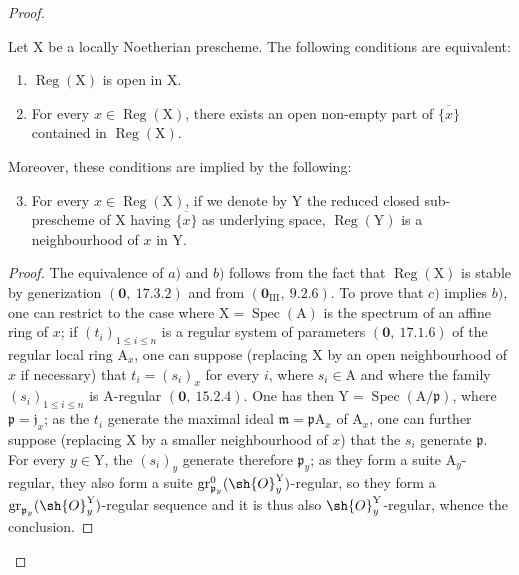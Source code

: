 \begin{proof}
\begin{proposition}[6.12.2]
\label{IV.6.12.2}
Let $\mathrm{X}$ be a locally Noetherian prescheme. The following conditions
are equivalent:
\begin{enumerate}[label=\emph{\alph*)}]
  \item $\operatorname{Reg}(\mathrm{X})$ is open in $\mathrm{X}$.
  \item For every $x\in\operatorname{Reg}(\mathrm{X})$, there exists an open non-empty part of $\overline{\{x\}}$ contained in $\operatorname{Reg}(\mathrm{X})$.
\end{enumerate}
Moreover, these conditions are implied by the following:
\begin{enumerate}[label=\emph{\alph*)}]
\setcounter{enumi}{2}
  \item For every $x\in\operatorname{Reg}(\mathrm{X})$, if we denote by $\mathrm{Y}$ the reduced closed sub-prescheme of $\mathrm{X}$ having $\overline{\{x\}}$
as underlying space, $\operatorname{Reg}(\mathrm{Y})$ is a neighbourhood of $x$ in $\mathrm{Y}$.
\end{enumerate}
\end{proposition}

\begin{proof}
The equivalence of $a)$ and $b)$ follows from the fact that $\operatorname{Reg}(\mathrm{X})$ is stable by generization
$(\mathbf{0},~17.3.2)$ and from $(\mathbf{0}_{\mathrm{III}},~9.2.6)$. To prove that $c)$ implies $b)$, one can restrict to the
case where $\mathrm{X}=\operatorname{Spec}(\mathrm{A})$ is the spectrum of an affine ring of $x$; if $(t_i)_{1\leqslant i\leqslant n}$ is a regular
system of parameters $(\mathbf{0},~17.1.6)$ of the regular local ring $\mathrm{A}_x$, one can suppose
(replacing $\mathrm{X}$ by an open neighbourhood of $x$ if necessary) that $t_i=(s_i)_x$ for every $i$,
where $s_i\in\mathrm{A}$ and where the family $(s_i)_{1\leqslant i\leqslant n}$ is $\mathrm{A}$-regular $(\mathbf{0},~15.2.4)$. One has then $\mathrm{Y}=\operatorname{Spec}(\mathrm{A}/\mathfrak{p})$,
where $\mathfrak{p}=\mathfrak{j}_x$; as the $t_i$ generate the maximal ideal $\mathfrak{m}=\mathfrak{p}\mathrm{A}_x$ of $\mathrm{A}_x$, one can further
suppose (replacing $\mathrm{X}$ by a smaller neighbourhood of $x$) that the $s_i$ generate $\mathfrak{p}$.
For every $y\in\mathrm{Y}$, the $(s_i)_y$ generate therefore $\mathfrak{p}_y$; as they form a suite $\mathrm{A}_y$-regular,
they also form a suite $\operatorname{gr}^0_{\mathfrak{p}_y}(\sh{O}^{\mathrm{Y}}_y)$-regular, so they form a
$\operatorname{gr}_{\mathfrak{p}_y}(\sh{O}^{\mathrm{Y}}_y)$-regular sequence and it is thus also $\sh{O}^{\mathrm{Y}}_y$-regular,
whence the conclusion.
\end{proof}


\end{proof}
